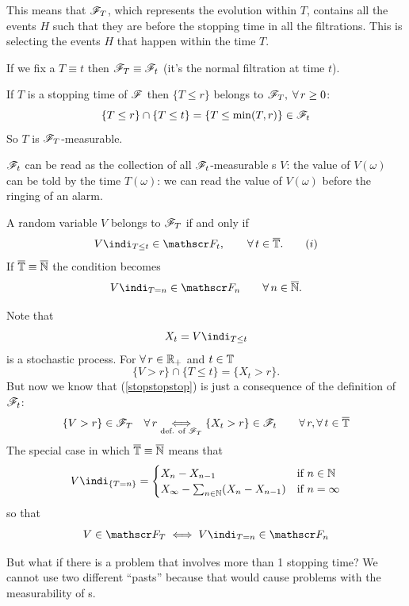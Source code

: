 \documentclass{report}
\begin{document}
This means that $\mathscr{F}_T$, which represents the evolution within $T$, contains all the events $H$ such that they are before the stopping time in all the filtrations. This is selecting the events $H$ that happen within the time $T$.
\begin{remark}
	If we fix a $T\equiv t$ then $\mathscr{F}_T\equiv\mathscr{F}_t$ (it's the normal filtration at time $t$).
\end{remark}
If $T$ is a stopping time of $\mathscr{F}$ then $\{T\leq r\}$ belongs to $\mathscr{F}_T,\;\forall\, r\geq 0$:
\[\{T\leq r\}\cap\{T\leq t\}=\{T\leq\min(T,r)\}\in\mathscr{F}_t\]
So $T$ is $\mathscr{F}_T$-measurable. 
\begin{remark}
	$\mathscr{F}_t$ can be read as the collection of all $\mathscr{F}_t$-measurable \rv{}s $V$: the value of $V(\omega)$ can be told by the time $T(\omega)$: we can read the value of $V(\omega)$ before the ringing of an alarm.
\end{remark}
\begin{theorem}
	A random variable $V$ belongs to $\mathscr{F}_T$ if and only if
	\begin{equation}
		V\indi_{T\leq t}\in\F_t,\qquad\every t\in\Tbar.\tag{$i$}\label{stopstopstop}
	\end{equation}
	If $\overline{\mathbb{T}}\equiv\overline{\mathbb{N}}$ the condition becomes
	\begin{equation*}
		V\indi_{T=n}\in\F_n\qquad\every n\in\overline{\N}.
	\end{equation*}
\end{theorem}
\begin{fancyproof}
	Note that 
	\[X_t=V\indi_{T\leq t}\]
	is a stochastic process. For $\forall\, r\in\mathbb{R}_+$ and $t\in\mathbb{T}$
	\[\{V>r\}\cap\{T\leq t\}=\{X_t>r\}.\]
	But now we know that (\ref{stopstopstop}) is just a consequence of the definition of $\mathscr{F}_t$:
	\[\{V>r\}\in\mathscr{F}_T\quad\forall\, r\underset{\text{def. of $\mathscr{F}_T$}}{\iff}\{X_t>r\}\in\mathscr{F}_t\qquad\forall\, r,\forall\, t\in\overline{\mathbb{T}}\]
	The special case in which $\overline{\mathbb{T}}\equiv\overline{\mathbb{N}}$ means that
	\[V\indi_{\{T=n\}}=\begin{cases}
		X_n-X_{n-1}&\text{if }n\in\N\\
		X_\infty-\sum_{n\in\N}(X_n-X_{n-1})&\text{if }n=\infty
	\end{cases}\]
	so that 
	\begin{equation*}
		V\in\F_T\iff V\indi_{T=n}\in\F_n
	\end{equation*}
\end{fancyproof}
But what if there is a problem that involves more than 1 stopping time? We cannot use two different ``pasts'' because that would cause problems with the measurability of \rv s. 
\end{document}
